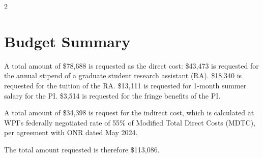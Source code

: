 \documentclass[10pt]{article}
\begin{document}
{\renewcommand{\bibfont}{\footnotesize}\setlength{\bibsep}{0pt}\setlength{\columnsep}{14pt}
\begin{multicols}{2}\raggedright


\end{multicols}}



\newpage\clearpage
\section*{Budget Summary}
A total amount of \$78,688 is requested as the direct cost:
\$43,473 is requested for the annual stipend of a graduate student research assistant (RA).
\$18,340 is requested for the tuition of the RA.
\$13,111 is requested for 1-month summer salary for the PI.
\$3,514 is requested for the fringe benefits of the PI.

A total amount of \$34,398 is request for the indirect cost, which is calculated at WPI’s federally negotiated rate of 55\% of Modified Total Direct Costs (MDTC), per agreement with ONR dated May 2024. 

The total amount requested is therefore \$113,086.
\end{document}
